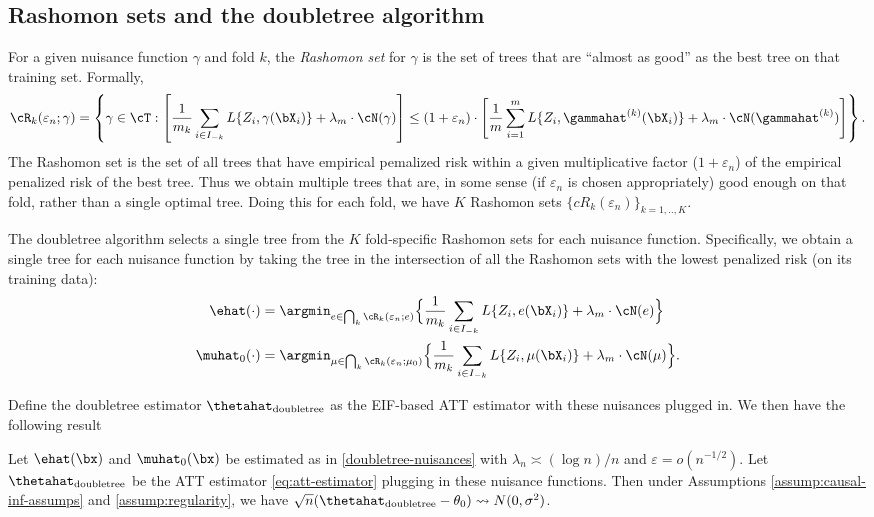 \documentclass[12pt]{article}
\begin{document}
\subsection{Rashomon sets and the doubletree algorithm}

For a given nuisance function $\gamma$ and fold $k$, the \emph{Rashomon set} for $\gamma$ is the set of trees that are ``almost as good'' as the best tree on that training set. Formally, 
\begin{align*}
\cR_k(\varepsilon_n; \gamma) = \left\{\gamma \in \cT : \left[ \frac{1}{m_k} \sum_{i\in I_{-k}} L\{Z_i, \gamma(\bX_i)\} + \lambda_m \cdot \cN(\gamma) \right] \le (1+\varepsilon_n) \cdot \left[ \frac{1}{m} \sum_{i=1}^m L\{Z_i, \gammahat^{(k)}(\bX_i)\} + \lambda_m \cdot \cN(\gammahat^{(k)})\right]\right\}.
\end{align*}
The Rashomon set is the set of all trees that have empirical pemalized risk within a given multiplicative factor ($1 + \varepsilon_n$) of the empirical penalized risk of the best tree. 
Thus we obtain multiple trees that are, in some sense (if $\varepsilon_n$ is chosen appropriately) good enough on that fold, rather than a single optimal tree. Doing this for each fold, we have $K$ Rashomon sets $\{cR_k(\varepsilon_n)\}_{k=1,..,K}$.

The doubletree algorithm selects a single tree from the $K$ fold-specific Rashomon sets for each nuisance function. Specifically, we obtain a single tree for each nuisance function by taking the tree in the intersection of all the Rashomon sets with the lowest penalized risk (on its training data):
\begin{align}\label{doubletree-nuisances}
\ehat(\cdot) &= \argmin_{e \in \bigcap_k \cR_k(\varepsilon_n; e)} \Bigl\{ \frac{1}{m_k} \sum_{i\in I_{-k}} L\{Z_i, e(\bX_i)\} + \lambda_m \cdot \cN(e)  \Bigr\}\\
\muhat_0(\cdot) &= \argmin_{\mu \in \bigcap_k \cR_k(\varepsilon_n; \mu_0)} \Bigl\{ \frac{1}{m_k} \sum_{i\in I_{-k}} L\{Z_i, \mu(\bX_i)\} + \lambda_m \cdot \cN(\mu)  \Bigr\}.
\end{align}

Define the doubletree estimator $\thetahat_{\text{doubletree}}$ as the EIF-based ATT estimator with these nuisances plugged in. We then have the following result
\begin{proposition}
Let $\ehat(\bx)$ and $\muhat_0(\bx)$ be estimated as in \eqref{doubletree-nuisances} with $\lambda_n \asymp (\log n)/n$ and $\varepsilon = o(n^{-1/2})$. Let $\thetahat_{\text{doubletree}}$ be the ATT estimator \eqref{eq:att-estimator} plugging in these nuisance functions. Then under Assumptions \ref{assump:causal-inf-assumps} and \ref{assump:regularity}, we have
$\sqrt{n}(\thetahat_{\text{doubletree}} - \theta_0) \leadsto N(0, \sigma^2)$.
\end{proposition}
\end{document}
